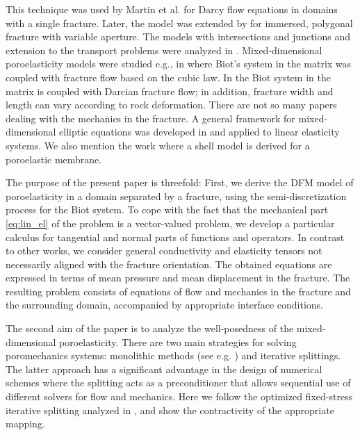 \documentclass[a4paper]{article}
\numberwithin{equation}{section}
\begin{document}
This technique was used by Martin et al. \cite{martin_modeling_2005} for Darcy flow equations in domains with a single fracture.
Later, the model was extended by \cite{angot2009asymptotic} for immersed, polygonal fracture with variable aperture. The models with intersections and junctions and extension to the transport problems were analyzed in \cite{maryska2005numerical,pichot2012generalized,formaggia2014reduced, schwenck2015dimensionally}. 
Mixed-dimensional poroelasticity models were studied e.g., in \cite{ganis2014modeling} where Biot's system in the matrix was coupled with fracture flow based on the cubic law.
In \cite{hanowski2018hydromechanical} the Biot system in the matrix is coupled with Darcian fracture flow; in addition, fracture width and length can vary according to rock deformation.
There are not so many papers dealing with the mechanics in the fracture.
A general framework for mixed-dimensional elliptic equations was developed in \cite{boon2019stable, boon2017functional} and applied to linear elasticity systems.
We also mention the work \cite{mikelic2019derivation} where a shell model is derived for a poroelastic membrane.

The purpose of the present paper is threefold:
First, we derive the DFM model of poroelasticity in a domain separated by a fracture, using the semi-discretization process for the Biot system.
To cope with the fact that the mechanical part \eqref{eq:lin_el} of the problem is a vector-valued problem, we develop a particular calculus for tangential and normal parts of functions and operators.
In contrast to other works, we consider general conductivity and elasticity tensors not necessarily aligned with the fracture orientation.
The obtained equations are expressed in terms of mean pressure and mean displacement in the fracture.
The resulting problem consists of equations of flow and mechanics in the fracture and the surrounding domain, accompanied by appropriate interface conditions.

The second aim of the paper is to analyze the well-posedness of the mixed-dimensional poroelasticity.
There are two main strategies for solving poromechanics systems: monolithic methods (see e.g. \cite{showalter2000diffusion,zenisek1984existence}) and iterative splittings.
The latter approach has a significant advantage in the design of numerical schemes where the splitting acts as a preconditioner \cite{white2016block} that allows sequential use of different solvers for flow and mechanics.
Here we follow the optimized fixed-stress iterative splitting analyzed in \cite{mikelic2013convergence}, and show the contractivity of the appropriate mapping.%
\end{document}
